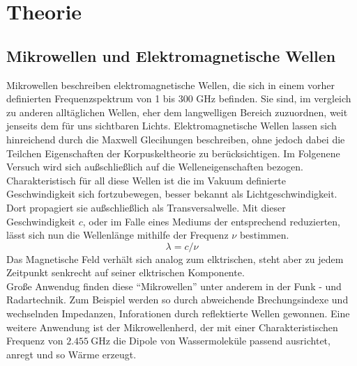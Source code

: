 \section{Theorie}

\subsection{Mikrowellen und Elektromagnetische Wellen }
Mikrowellen beschreiben elektromagnetische Wellen, die sich in einem vorher definierten Frequenzspektrum von 1 bis 300 $\si{\giga\hertz}$ befinden. 
Sie sind, im vergleich zu anderen alltäglichen Wellen, eher dem langwelligen Bereich zuzuordnen, weit jenseits dem für uns sichtbaren Lichts.
Elektromagnetische Wellen lassen sich hinreichend durch die Maxwell Glecihungen beschreiben, ohne jedoch dabei die Teilchen Eigenschaften der Korpuskeltheorie zu berücksichtigen. Im Folgenene Versuch wird sich außschließlich auf die Welleneigenschaften bezogen.
Charakteristisch für all diese Wellen ist die im Vakuum definierte Geschwindigkeit sich fortzubewegen, besser bekannt als Lichtgeschwindigkeit. Dort propagiert sie außschließlich als Transversalwelle.
Mit dieser Geschwindigkeit $c$, oder im Falle eines Mediums der entsprechend reduzierten, lässt sich nun die Wellenlänge mithilfe der Frequenz $\nu$ bestimmen.
\begin{equation*}
\lambda = c/{\nu}
\end{equation*}
Das Magnetische Feld verhält sich analog zum elktrischen, steht aber zu jedem Zeitpunkt senkrecht auf seiner elktrischen Komponente. \\  Große Anwendug 
finden diese \enquote{Mikrowellen} unter anderem in der Funk - und Radartechnik. Zum Beispiel werden so durch abweichende Brechungsindexe und wechselnden Impedanzen,  Inforationen durch reflektierte Wellen gewonnen. 
Eine weitere Anwendung ist der Mikrowellenherd, der mit einer Charakteristischen Frequenz von $\SI{2.455}{\giga\hertz}$ die Dipole von Wassermoleküle passend ausrichtet, anregt und so Wärme erzeugt.

